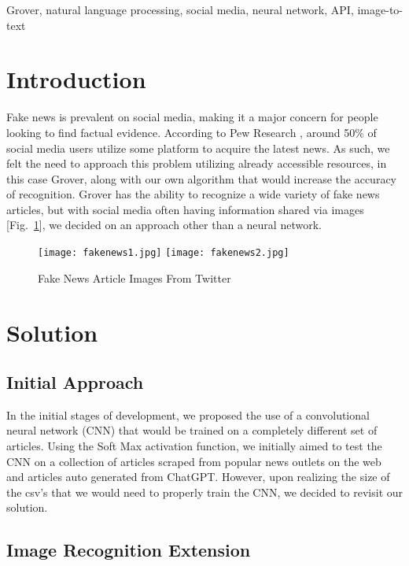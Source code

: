 \documentclass[conference]{IEEEtran}
\begin{document}
\begin{IEEEkeywords}
Grover, natural language processing, social media, neural network, API, image-to-text
\end{IEEEkeywords}

\section{Introduction}
Fake news is prevalent on social media, making it a major concern for people looking to find factual evidence. According to Pew Research \cite{pew2021news}, around 50\% of social media users utilize some platform to acquire the latest news. As such, we felt the need to approach this problem utilizing already accessible resources, in this case Grover, along with our own algorithm that would increase the accuracy of recognition. Grover has the ability to recognize a wide variety of fake news articles, but with social media often having information shared via images [Fig.~\ref{fig:fakenews1}], we decided on an approach other than a neural network.   

\begin{figure}
\centering
    \texttt{[image: fakenews1.jpg]}
    \texttt{[image: fakenews2.jpg]}
    \caption{Fake News Article Images From Twitter}
\label{fig:fakenews1}
\end{figure}

\section{Solution}

\subsection{Initial Approach}

In the initial stages of development, we proposed the use of a convolutional neural network (CNN) that would be trained on a completely different set of articles. Using the Soft Max activation function, we initially aimed to test the CNN on a collection of articles scraped from popular news outlets on the web and articles auto generated from ChatGPT. However, upon realizing the size of the csv's that we would need to properly train the CNN, we decided to revisit our solution. 


\subsection{Image Recognition Extension}
\end{document}
